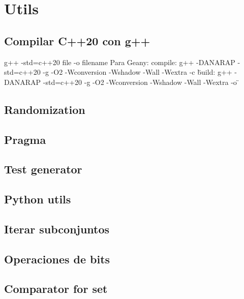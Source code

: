 \newpage
\section{Utils}
\subsection{Compilar C++20 con g++}
\begin{code}
g++ -std=c++20 {file} -o {filename}
Para Geany:
compile: g++ -DANARAP -std=c++20 -g -O2 -Wconversion -Wshadow -Wall -Wextra -c \"%
build:   g++ -DANARAP -std=c++20 -g -O2 -Wconversion -Wshadow -Wall -Wextra -o \"%
\end{code}
\subsection{Randomization}

\subsection{Pragma}


\subsection{Test generator}

\subsection{Python utils}


\subsection{Iterar subconjuntos}

\subsection{Operaciones de bits}


\subsection{Comparator for set}


